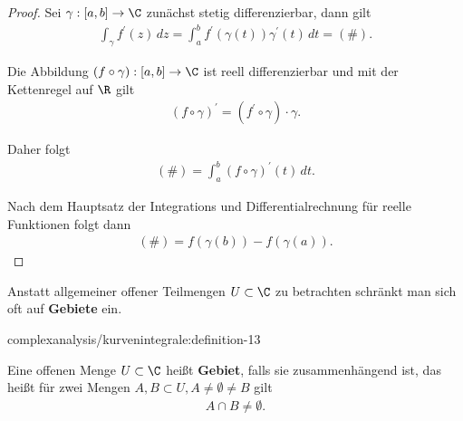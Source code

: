 \documentclass[letterpaper,10pt,german]{jupyterBook}
\begin{document}
\begin{proof}
 Sei \(\gamma:[a,b]\to\C\) zunächst stetig differenzierbar, dann gilt
\begin{align*}
\int_\gamma f^\prime(z)\, dz = \int_a^b f^\prime(\gamma(t))\gamma^\prime(t)\, dt =(\#).
\end{align*}
\par
Die Abbildung \((f\circ \gamma):[a,b]\to\C\) ist reell differenzierbar und mit der Kettenregel auf \(\R\) gilt
\begin{align*}
(f\circ\gamma)^\prime = (f^\prime\circ\gamma)\cdot\gamma.
\end{align*}
\par
Daher folgt
\begin{align*}
(\#) = \int_a^b (f\circ \gamma)^\prime(t)\, dt.
\end{align*}
\par
Nach dem Hauptsatz der Integrations und Differentialrechnung für reelle Funktionen folgt dann
\begin{align*}
(\#) = f(\gamma(b)) - f(\gamma(a)).\end{align*}\end{proof}

\par
Anstatt allgemeiner offener Teilmengen \(U\subset\C\) zu betrachten schränkt man sich oft auf \textbf{Gebiete} ein.
\begin{definition}{}{complexanalysis/kurvenintegrale:definition-13}



\par
Eine offenen Menge \(U\subset\C\) heißt \textbf{Gebiet}, falls sie zusammenhängend ist, das heißt für zwei Mengen \(A,B\subset U,A\neq\emptyset\neq B\) gilt
\begin{align*}
A\cap B \neq \emptyset.
\end{align*}\end{definition}
\end{document}
